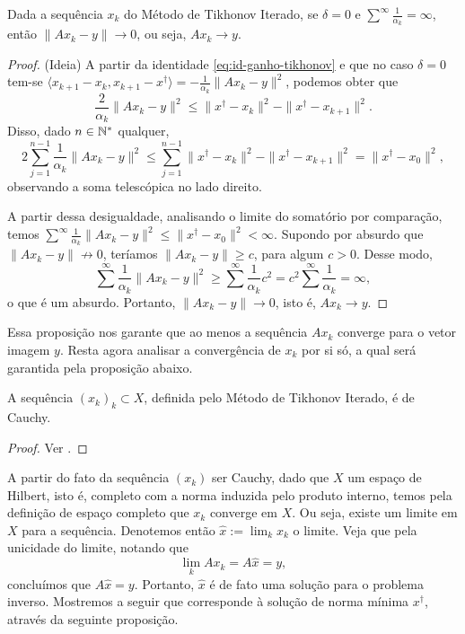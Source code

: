 \begin{prop}
Dada a sequência $x_k$ do Método de Tikhonov Iterado, se $\delta=0$ e $\sum^\infty \frac 1 {\alpha_k} = \infty$, então $\|Ax_k - y \|\to 0$, ou seja, $Ax_k \to y$.
\end{prop}
\begin{proof}
    (Ideia) A partir da identidade \eqref{eq:id-ganho-tikhonov} e que no caso $\delta=0$ tem-se $\langle x_{k+1}-x_k, x_{k+1}-x^\dag \rangle = - \frac{1}{\alpha_k} \|Ax_k-y\|^2$, podemos obter que
    \[ 
        \frac{2}{\alpha_k} \|Ax_k - y \|^2 \leq \|x^\dag-x_k \|^2 - \|x^\dag - x_{k+1}\|^2.
    \]
    Disso, dado $n\in \mathbb N^*$ qualquer,
    \[
    2 \sum^{n-1}_{j=1} \frac{1}{\alpha_k} \|Ax_k - y \|^2 \leq \sum^{n-1}_{j=1} \|x^\dag-x_k \|^2 - \|x^\dag - x_{k+1}\|^2 = \|x^\dag-x_0\|^2,
    \] 
    observando a soma telescópica no lado direito. 
    
    A partir dessa desigualdade,  analisando o limite do somatório por comparação, temos $\sum^\infty \frac{1}{\alpha_k}\|Ax_k-y\|^2 \leq \|x^\dag-x_0\|^2 < \infty$. Supondo por absurdo que $\|Ax_k - y\|\not \to 0$, teríamos $\|Ax_k - y\| \geq c$, para algum $c>0$. Desse modo, 
    \[
        \sum^\infty \frac{1}{\alpha_k}\|Ax_k-y\|^2 \geq
        \sum^\infty \frac{1}{\alpha_k}c^2 = c^2\sum^\infty \frac{1}{\alpha_k} = \infty,
    \]
    o que é um absurdo. Portanto, $\|Ax_k - y\|\to 0$, isto é, $Ax_k \to y$.
\end{proof}

Essa proposição nos garante que ao menos a sequência $Ax_k$ converge para o vetor imagem $y$. Resta agora analisar a convergência de $x_k$ por si só, a qual será garantida pela proposição abaixo.

\begin{prop}
    A sequência $(x_k)_k \subset X$, definida pelo Método de Tikhonov Iterado, é de Cauchy.
\end{prop}
\begin{proof}
    Ver \cite{??}.
\end{proof}

A partir do fato da sequência $(x_k)$ ser Cauchy, dado que $X$ um espaço de Hilbert, isto é, completo com a norma induzida pelo produto interno, temos pela definição de espaço completo que $x_k$ converge em $X$. Ou seja, existe um limite em $X$ para a sequência. Denotemos então $\hat x := \lim_k x_k$ o limite. Veja que pela unicidade do limite, notando que 
\[
\lim_k Ax_k = A\hat x = y,
\]
concluímos que $A\hat x = y$. Portanto, $\hat x$ é de fato uma solução para o problema inverso. Mostremos a seguir que corresponde à solução de norma mínima $x^\dag$, através da seguinte proposição.

